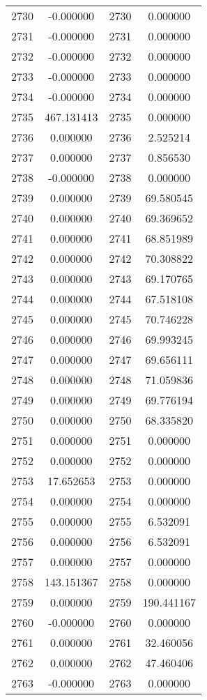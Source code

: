\documentclass[12pt]{article}
\begin{document}
\begin{longtable}{@{}cccc@{}}
2730 & -0.000000 & 2730 & 0.000000 \\
2731 & -0.000000 & 2731 & 0.000000 \\
2732 & -0.000000 & 2732 & 0.000000 \\
2733 & -0.000000 & 2733 & 0.000000 \\
2734 & -0.000000 & 2734 & 0.000000 \\
2735 & 467.131413 & 2735 & 0.000000 \\
2736 & 0.000000 & 2736 & 2.525214 \\
2737 & 0.000000 & 2737 & 0.856530 \\
2738 & -0.000000 & 2738 & 0.000000 \\
2739 & 0.000000 & 2739 & 69.580545 \\
2740 & 0.000000 & 2740 & 69.369652 \\
2741 & 0.000000 & 2741 & 68.851989 \\
2742 & 0.000000 & 2742 & 70.308822 \\
2743 & 0.000000 & 2743 & 69.170765 \\
2744 & 0.000000 & 2744 & 67.518108 \\
2745 & 0.000000 & 2745 & 70.746228 \\
2746 & 0.000000 & 2746 & 69.993245 \\
2747 & 0.000000 & 2747 & 69.656111 \\
2748 & 0.000000 & 2748 & 71.059836 \\
2749 & 0.000000 & 2749 & 69.776194 \\
2750 & 0.000000 & 2750 & 68.335820 \\
2751 & 0.000000 & 2751 & 0.000000 \\
2752 & 0.000000 & 2752 & 0.000000 \\
2753 & 17.652653 & 2753 & 0.000000 \\
2754 & 0.000000 & 2754 & 0.000000 \\
2755 & 0.000000 & 2755 & 6.532091 \\
2756 & 0.000000 & 2756 & 6.532091 \\
2757 & 0.000000 & 2757 & 0.000000 \\
2758 & 143.151367 & 2758 & 0.000000 \\
2759 & 0.000000 & 2759 & 190.441167 \\
2760 & -0.000000 & 2760 & 0.000000 \\
2761 & 0.000000 & 2761 & 32.460056 \\
2762 & 0.000000 & 2762 & 47.460406 \\
2763 & -0.000000 & 2763 & 0.000000 \\

\end{longtable}
\end{document}
